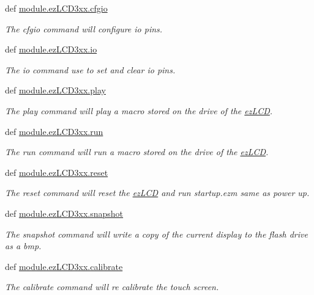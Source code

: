 \begin{DoxyCompactItemize}
def \hyperlink{group___general_ga84837123679c1b262b8bb29108019dda}{module.\-ez\-L\-C\-D3xx.\-cfgio}
\begin{DoxyCompactList}\small\item\em The cfgio command will configure io pins. \end{DoxyCompactList}\item 
def \hyperlink{group___general_gad7ece2d1355d0be3f7df9ce216cb5286}{module.\-ez\-L\-C\-D3xx.\-io}
\begin{DoxyCompactList}\small\item\em The io command use to set and clear io pins. \end{DoxyCompactList}\item 
def \hyperlink{group___general_ga7d904406a210cad98e2d762dae76d553}{module.\-ez\-L\-C\-D3xx.\-play}
\begin{DoxyCompactList}\small\item\em The play command will play a macro stored on the drive of the \hyperlink{classmodule_1_1ez_l_c_d3xx_1_1ez_l_c_d}{ez\-L\-C\-D}. \end{DoxyCompactList}\item 
def \hyperlink{group___general_ga0535965cf75c9a6f4f6039a1d1399d81}{module.\-ez\-L\-C\-D3xx.\-run}
\begin{DoxyCompactList}\small\item\em The run command will run a macro stored on the drive of the \hyperlink{classmodule_1_1ez_l_c_d3xx_1_1ez_l_c_d}{ez\-L\-C\-D}. \end{DoxyCompactList}\item 
def \hyperlink{group___general_gad09d3f52045f116eb41726211f8909a4}{module.\-ez\-L\-C\-D3xx.\-reset}
\begin{DoxyCompactList}\small\item\em The reset command will reset the \hyperlink{classmodule_1_1ez_l_c_d3xx_1_1ez_l_c_d}{ez\-L\-C\-D} and run startup.\-ezm same as power up. \end{DoxyCompactList}\item 
def \hyperlink{group___general_gaf906c49e26bdd7b09f58d80675a0d4f5}{module.\-ez\-L\-C\-D3xx.\-snapshot}
\begin{DoxyCompactList}\small\item\em The snapshot command will write a copy of the current display to the flash drive as a bmp. \end{DoxyCompactList}\item 
\hypertarget{group___general_ga44f3daeee41eaaf35752594e6543a619}{def \hyperlink{group___general_ga44f3daeee41eaaf35752594e6543a619}{module.\-ez\-L\-C\-D3xx.\-calibrate}}\label{group___general_ga44f3daeee41eaaf35752594e6543a619}

\begin{DoxyCompactList}\small\item\em The calibrate command will re calibrate the touch screen. \end{DoxyCompactList}\end{DoxyCompactItemize}



